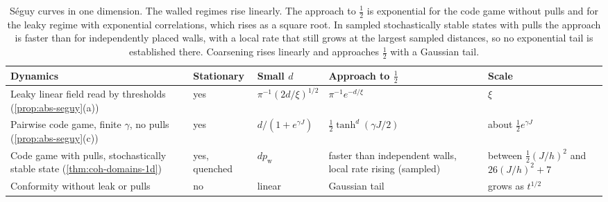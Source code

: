 \begin{table}[t]
\centering\small
\caption{S\'eguy curves in one dimension. The walled regimes rise linearly. The approach to $\frac12$ is exponential for the code game without pulls and for the leaky regime with exponential correlations, which rises as a square root. In sampled stochastically stable states with pulls the approach is faster than for independently placed walls, with a local rate that still grows at the largest sampled distances, so no exponential tail is established there. Coarsening rises linearly and approaches $\frac12$ with a Gaussian tail.}
\label{tab:abs-seguy}
\begin{tabular}{@{}>{\raggedright\arraybackslash}p{}>{\raggedright\arraybackslash}p{}>{\raggedright\arraybackslash}p{}>{\raggedright\arraybackslash}p{}>{\raggedright\arraybackslash}p{}@{}}
\toprule
Dynamics & Stationary & Small $d$ & Approach to $\frac12$ & Scale\\
\midrule
Leaky linear field read by thresholds (\cref{prop:abs-seguy}(a)) & yes & $\pi^{-1}(2d/\xi)^{1/2}$ & $\pi^{-1}e^{-d/\xi}$ & $\xi$\\
Pairwise code game, finite $\gamma$, no pulls (\cref{prop:abs-seguy}(c)) & yes & $d/(1+e^{\gamma J})$ & $\frac12\tanh^d(\gamma J/2)$ & about $\frac12e^{\gamma J}$\\
Code game with pulls, stochastically stable state (\cref{thm:coh-domains-1d}) & yes, quenched & $dp_{\mathrm w}$ & faster than independent walls, local rate rising (sampled) & between $\frac12(J/h)^2$ and $26(J/h)^2+7$\\
Conformity without leak or pulls \citep{burridge2017spatial} & no & linear & Gaussian tail & grows as $t^{1/2}$\\
\bottomrule
\end{tabular}
\end{table}

